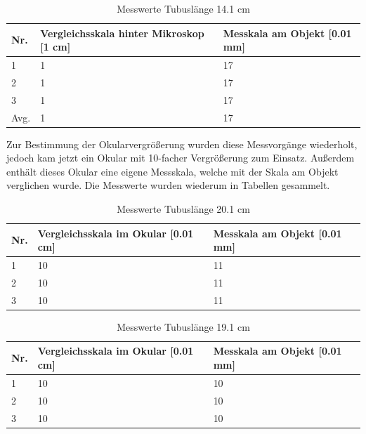 \documentclass[12pt,a4paper,twoside]{article}
\begin{document}
\begin{table}[H]
    \centering
    \caption{Messwerte Tubuslänge 14.1 cm}
    \label{tab:messwerteTB14}
    \begin{tabular}{| l | l | l |}
        \hline
        Nr.   & Vergleichsskala hinter Mikroskop [1 cm]  & Messkala am Objekt [0.01 mm] \\
        \hline
        1 & 1 & 17 \\
        2 & 1 & 17 \\
        3 & 1 & 17 \\
        \hline
        Avg. & 1 & 17 \\
        \hline
    \end{tabular}
\end{table}

\noindent
Zur Bestimmung der Okularvergrößerung wurden diese Messvorgänge wiederholt, jedoch kam jetzt ein Okular mit 10-facher Vergrößerung zum Einsatz. 
Außerdem enthält dieses Okular eine eigene Messskala, welche mit der Skala am Objekt verglichen wurde.
Die Messwerte wurden wiederum in Tabellen gesammelt.

\begin{table}[H]
    \centering
    \caption{Messwerte Tubuslänge 20.1 cm}
    \label{tab:10XmesswerteTB20}
    \begin{tabular}{| l | l | l |}
        \hline
        Nr.   & Vergleichsskala im Okular [0.01 cm]  & Messkala am Objekt [0.01 mm] \\
        \hline
        1 & 10 & 11 \\
        2 & 10 & 11 \\
        3 & 10 & 11 \\
        \hline
    \end{tabular}
\end{table}

\begin{table}[H]
    \centering
    \caption{Messwerte Tubuslänge 19.1 cm}
    \label{tab:10XmesswerteTB19}
    \begin{tabular}{| l | l | l |}
        \hline
        Nr.   & Vergleichsskala im Okular [0.01 cm]  & Messkala am Objekt [0.01 mm] \\
        \hline
        1 & 10 & 10 \\
        2 & 10 & 10 \\
        3 & 10 & 10 \\
        \hline
    \end{tabular}
\end{table}
\end{document}
